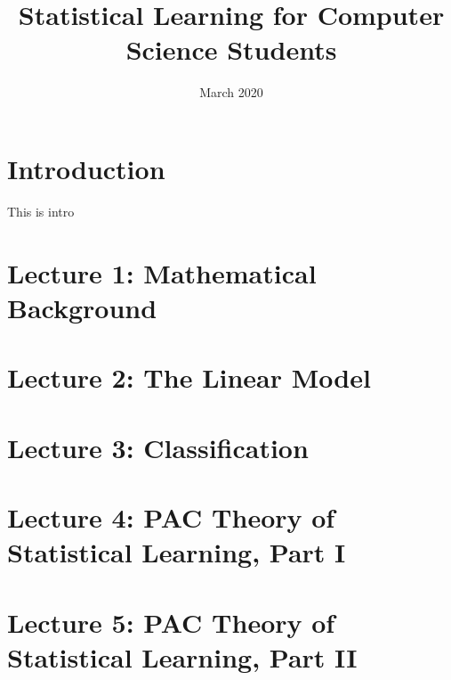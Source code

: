 \documentclass[11pt]{article}
\title{Statistical Learning for Computer Science Students}
\date{March 2020}
\begin{document}
\maketitle

\tableofcontents



\newpage
\part*{Introduction}
\label{part:intro}
This is intro
%

\newpage
\part*{Lecture 1: Mathematical Background}
\label{part:lecture_1}


\newpage
\part*{Lecture 2: The Linear Model}
\label{part:lecture_2}


\newpage
\part*{Lecture 3: Classification}
\label{part:lecture_3}


\newpage
\part*{Lecture 4: PAC Theory of Statistical Learning, Part I}
\label{part:lecture_4}


\newpage
\part*{Lecture 5: PAC Theory of Statistical Learning, Part II}
\label{part:lecture_5}

\end{document}
